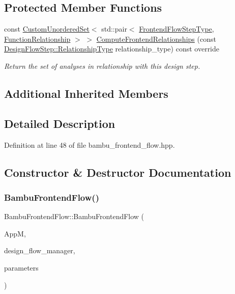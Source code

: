 \subsection*{Protected Member Functions}
\begin{DoxyCompactItemize}
\item 
const \hyperlink{classCustomUnorderedSet}{Custom\+Unordered\+Set}$<$ std\+::pair$<$ \hyperlink{frontend__flow__step_8hpp_afeb3716c693d2b2e4ed3e6d04c3b63bb}{Frontend\+Flow\+Step\+Type}, \hyperlink{classFrontendFlowStep_af7cf30f2023e5b99e637dc2058289ab0}{Function\+Relationship} $>$ $>$ \hyperlink{classBambuFrontendFlow_af5ffc3e14700fa4cb8410cca5c886ae0}{Compute\+Frontend\+Relationships} (const \hyperlink{classDesignFlowStep_a723a3baf19ff2ceb77bc13e099d0b1b7}{Design\+Flow\+Step\+::\+Relationship\+Type} relationship\+\_\+type) const override
\begin{DoxyCompactList}\small\item\em Return the set of analyses in relationship with this design step. \end{DoxyCompactList}\end{DoxyCompactItemize}
\subsection*{Additional Inherited Members}


\subsection{Detailed Description}


Definition at line 48 of file bambu\+\_\+frontend\+\_\+flow.\+hpp.



\subsection{Constructor \& Destructor Documentation}
\mbox{\label{classBambuFrontendFlow_acebe2814139d097f3ce8ceb387116bcb}} 
\subsubsection{\texorpdfstring{Bambu\+Frontend\+Flow()}{BambuFrontendFlow()}}
{\footnotesize\ttfamily Bambu\+Frontend\+Flow\+::\+Bambu\+Frontend\+Flow (\begin{DoxyParamCaption}\item[{const \hyperlink{application__manager_8hpp_a04ccad4e5ee401e8934306672082c180}{application\+\_\+manager\+Ref}}]{AppM,  }\item[{const Design\+Flow\+Manager\+Const\+Ref}]{design\+\_\+flow\+\_\+manager,  }\item[{const \hyperlink{Parameter_8hpp_a37841774a6fcb479b597fdf8955eb4ea}{Parameter\+Const\+Ref}}]{parameters }\end{DoxyParamCaption})}



